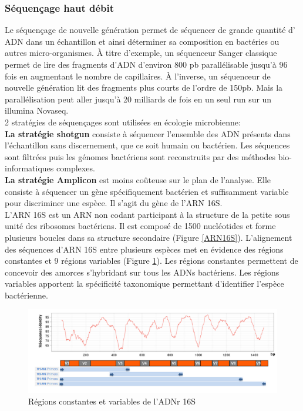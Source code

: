 \documentclass[12pt,a4paper]{article}
\begin{document}
\subsubsection{Séquençage haut débit}
Le séquençage de nouvelle génération permet de séquencer de grande quantité d' ADN dans un échantillon et ainsi déterminer sa composition en bactéries ou autres micro-organismes. À titre d'exemple, un séquenceur Sanger classique permet de lire des fragments d'ADN d'environ 800 pb parallélisable jusqu'à 96 fois en augmentant le nombre de capillaires. 
À l'inverse, un séquenceur de nouvelle génération lit des fragments plus courts de l'ordre de 150pb. Mais la parallélisation peut aller jusqu'à 20 milliards de fois en un seul run sur un illumina Novaseq. \\
2 stratégies de séquençages sont utilisées en écologie microbienne:  \\
\textbf{La stratégie shotgun} consiste à séquencer l'ensemble des  ADN présents dans l'échantillon sans discernement, que ce soit humain ou bactérien. Les séquences sont filtrées puis les génomes bactériens sont reconstruits par des méthodes bio-informatiques complexes. \\
\textbf{La stratégie Amplicon} est moins coûteuse sur le plan de l'analyse. Elle consiste à séquencer un gène spécifiquement bactérien et suffisamment variable pour discriminer une espèce. Il s'agit du gène de l'ARN 16S.\\
L'ARN 16S est un ARN non codant participant à la structure de la petite sous unité des ribosomes bactériens. Il est composé de 1500 nucléotides et forme plusieurs boucles dans sa structure secondaire (Figure \ref{ARN16S}). 
L'alignement des séquences d'ARN 16S entre plusieurs espèces met en évidence des régions constantes et 9 régions variables (Figure \ref{ARN16SVariation}). Les régions constantes permettent de concevoir des amorces s'hybridant sur tous les ADNs bactériens. Les régions variables apportent la spécificité taxonomique permettant d'identifier l'espèce bactérienne.

\begin{figure}[ht]
\begin{center}
\includegraphics[scale=0.8]{img/ARN16S_variation.png}\hfill
\end{center}
\caption{Régions constantes et variables de l'ADNr 16S}
\label{ARN16SVariation}
\end{figure}
\end{document}
